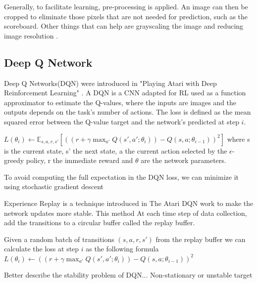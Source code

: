 Generally, to facilitate learning, pre-processing is applied.
An image can then be cropped to eliminate those pixels that are not needed for prediction, such as the scoreboard. Other things that can help are grayscaling the image and reducing image resolution \cite{mnih2013playing}.

\subsection{Deep Q Network}
Deep Q Networks(DQN) were introduced in "Playing Atari with Deep Reinforcement Learning" \cite{mnih2013playing}.
A DQN is a CNN adapted for RL used as a function approximator to estimate the Q-values, where the inputs are images and the outputs depends on the task's number of actions.
The loss is defined as the mean squared error between the Q-value target and the network's predicted at step $i$.

$L(\theta_i) \leftarrow \mathbb{E}_{s, a, r, s'} [((r + \gamma \max_{a'} Q(s', a'; \theta_i)) - Q(s, a; \theta_{i-1}))^2]$
where s is the current state, s' the next state, a the current action selected by the $\epsilon$-greedy policy, r the immediate reward and $\theta$ are the network parameters.

To avoid computing the full expectation in the DQN loss, we can minimize it using stochastic gradient descent

Experience Replay is a technique introduced in The Atari DQN work to make the network updates more stable.
This method At each time step of data collection, add the transitions to a circular buffer called the replay buffer.

Given a random batch of transitions $(s, a, r, s')$ from the replay buffer we can calculate the loss at step $i$ as the following formula
$L(\theta_i) \leftarrow ((r + \gamma \max_{a'} Q(s', a'; \theta_i)) - Q(s, a; \theta_{i-1}))^2$

Better describe the stability problem of DQN... Non-stationary or unstable target
